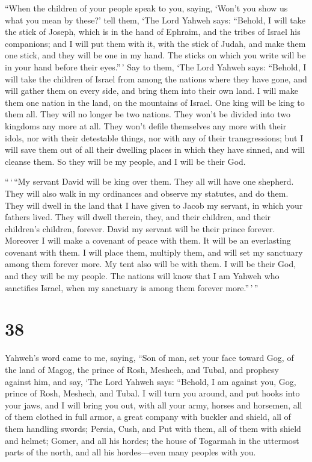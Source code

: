  ``When the children of your people speak to you, saying,
`Won't you show us what you mean by these?'  tell them,
`The Lord Yahweh says: ``Behold, I will take the stick of Joseph, which
is in the hand of Ephraim, and the tribes of Israel his companions; and
I will put them with it, with the stick of Judah, and make them one
stick, and they will be one in my hand.  The sticks on
which you write will be in your hand before their eyes.''\,'
 Say to them, `The Lord Yahweh says: ``Behold, I will
take the children of Israel from among the nations where they have gone,
and will gather them on every side, and bring them into their own land.
 I will make them one nation in the land, on the
mountains of Israel. One king will be king to them all. They will no
longer be two nations. They won't be divided into two kingdoms any more
at all.  They won't defile themselves any more with their
idols, nor with their detestable things, nor with any of their
transgressions; but I will save them out of all their dwelling places in
which they have sinned, and will cleanse them. So they will be my
people, and I will be their God.

 ``\,`\,``My servant David will be king over them. They
all will have one shepherd. They will also walk in my ordinances and
observe my statutes, and do them.  They will dwell in the
land that I have given to Jacob my servant, in which your fathers lived.
They will dwell therein, they, and their children, and their children's
children, forever. David my servant will be their prince forever.
 Moreover I will make a covenant of peace with them. It
will be an everlasting covenant with them. I will place them, multiply
them, and will set my sanctuary among them forever more. 
My tent also will be with them. I will be their God, and they will be my
people.  The nations will know that I am Yahweh who
sanctifies Israel, when my sanctuary is among them forever
more.''\,'\,''

\hypertarget{section-37}{%
\section{38}\label{section-37}}

 Yahweh's word came to me, saying,  ``Son of
man, set your face toward Gog, of the land of Magog, the prince of Rosh,
Meshech, and Tubal, and prophesy against him,  and say,
`The Lord Yahweh says: ``Behold, I am against you, Gog, prince of Rosh,
Meshech, and Tubal.  I will turn you around, and put hooks
into your jaws, and I will bring you out, with all your army, horses and
horsemen, all of them clothed in full armor, a great company with
buckler and shield, all of them handling swords;  Persia,
Cush, and Put with them, all of them with shield and helmet;
 Gomer, and all his hordes; the house of Togarmah in the
uttermost parts of the north, and all his hordes---even many peoples
with you.

